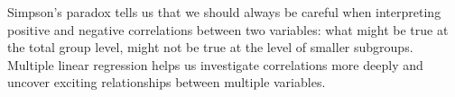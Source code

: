 \documentclass[]{book}\usepackage[]{graphicx}\usepackage[]{color}
\begin{document}
Simpson's paradox tells us that we should always be careful when interpreting positive and negative correlations between two variables: what might be true at the total group level, might not be true at the level of smaller subgroups. Multiple linear regression helps us investigate correlations more deeply and uncover exciting relationships between multiple variables.


% 
% 
% 
% 
% 
% 
% 
% 
% 
% 
% 
% 
% 
% 
% 
% 
\end{document}
